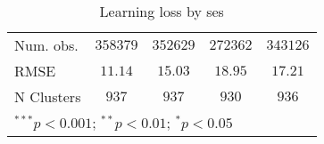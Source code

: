 \begin{table}
\begin{center}
\begin{tabular}{l c c c c}
Num. obs.                   & $358379$      & $352629$      & $272362$      & $343126$      \\
RMSE                        & $11.14$       & $15.03$       & $18.95$       & $17.21$       \\
N Clusters                  & $937$         & $937$         & $930$         & $936$         \\
\hline
\multicolumn{5}{l}{\scriptsize{$^{***}p<0.001$; $^{**}p<0.01$; $^{*}p<0.05$}}
\end{tabular}
\caption{Learning loss by ses}
\label{tableses}
\end{center}
\end{table}
